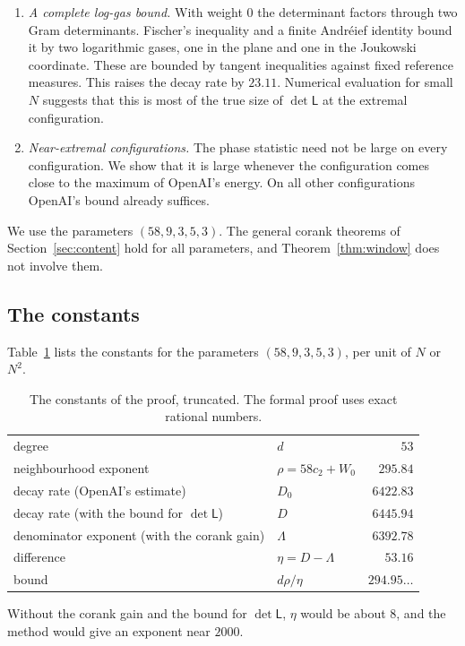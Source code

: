 \documentclass[11pt]{amsart}
\theoremstyle{definition}
\theoremstyle{remark}
\numberwithin{equation}{section}
\begin{document}
\begin{enumerate}[label=\arabic*.,wide]
\item \emph{A complete log-gas bound.} With weight $0$ the determinant factors through two Gram
determinants. Fischer's inequality and a finite Andr\'eief identity bound it by two logarithmic gases, one
in the plane and one in the Joukowski coordinate. These are bounded by tangent inequalities against fixed
reference measures. This raises the decay rate by $23.11$. Numerical evaluation for small $N$ suggests that
this is most of the true size of $\det\mathsf L$ at the extremal configuration.

\item \emph{Near-extremal configurations.} The phase statistic need not be large on every configuration.
We show that it is large whenever the configuration comes close to the maximum of OpenAI's energy. On all
other configurations OpenAI's bound already suffices.
\end{enumerate}
We use the parameters $(58,9,3,5,3)$. The general corank theorems of Section~\ref{sec:content} hold for all
parameters, and Theorem~\ref{thm:window} does not involve them.

\subsection{The constants}
Table~\ref{tab:constants} lists the constants for the parameters $(58,9,3,5,3)$, per unit of $N$ or $N^2$.
\begin{table}[ht]\centering
\begin{tabular}{@{}llr@{}}\toprule
degree & $d$ & $53$\\
neighbourhood exponent & $\rho=58c_2+W_0$ & $295.84$\\
decay rate (OpenAI's estimate) & $D_0$ & $6422.83$\\
decay rate (with the bound for $\det\mathsf L$) & $D$ & $6445.94$\\
denominator exponent (with the corank gain) & $\Lambda$ & $6392.78$\\
difference & $\eta=D-\Lambda$ & $53.16$\\
\midrule
bound & $d\rho/\eta$ & $294.95\ldots$\\\bottomrule
\end{tabular}
\caption{The constants of the proof, truncated. The formal proof uses exact rational numbers.}
\label{tab:constants}\end{table}
Without the corank gain and the bound for $\det\mathsf L$, $\eta$ would be about $8$, and the method would give an
exponent near $2000$.
\end{document}
